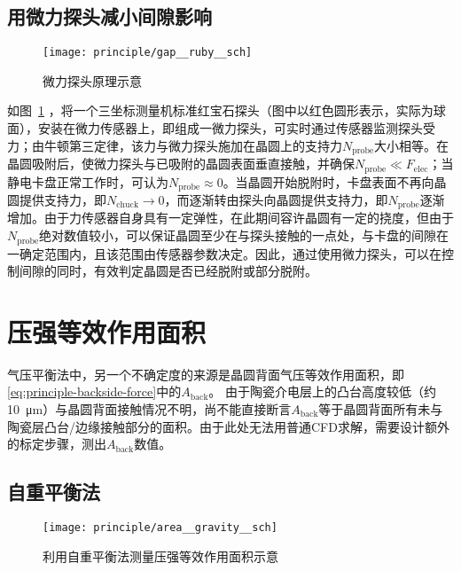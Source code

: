 \subsection{用微力探头减小间隙影响}\label{principle-gap-ruby}

\begin{figure}[tbhp]
\centering
\texttt{[image: principle/gap\_\_ruby\_\_sch]}
\caption{微力探头原理示意}
\label{fig:principle-gap-ruby-sch}
\end{figure}

如图~\ref{fig:principle-gap-ruby-sch} ，将一个三坐标测量机标准红宝石探头（图中以红色圆形表示，实际为球面），安装在微力传感器上，即组成一微力探头，可实时通过传感器监测探头受力；由牛顿第三定律，该力与微力探头施加在晶圆上的支持力$N_{\mathrm{probe}}$大小相等。在晶圆吸附后，使微力探头与已吸附的晶圆表面垂直接触，并确保$N_{\mathrm{probe}} \ll F_{\mathrm{elec}}$；当静电卡盘正常工作时，可认为$N_{\mathrm{probe}} \approx 0$。当晶圆开始脱附时，卡盘表面不再向晶圆提供支持力，即$N_{\mathrm{chuck}} \to 0$，而逐渐转由探头向晶圆提供支持力，即$N_{\mathrm{probe}}$逐渐增加。由于力传感器自身具有一定弹性，在此期间容许晶圆有一定的挠度，但由于$N_{\mathrm{probe}}$绝对数值较小，可以保证晶圆至少在与探头接触的一点处，与卡盘的间隙在一确定范围内，且该范围由传感器参数决定。因此，通过使用微力探头，可以在控制间隙的同时，有效判定晶圆是否已经脱附或部分脱附。




\section{压强等效作用面积}\label{principle-area}

气压平衡法中，另一个不确定度的来源是晶圆背面气压等效作用面积，即\eqref{eq:principle-backside-force}中的$A_{\mathrm{back}}$。
由于陶瓷介电层上的凸台高度较低（约\SI{10}{\micro\meter}）与晶圆背面接触情况不明，尚不能直接断言$A_{\mathrm{back}}$等于晶圆背面所有未与陶瓷层凸台/边缘接触部分的面积。由于此处无法用普通CFD求解，需要设计额外的标定步骤，测出$A_{\mathrm{back}}$数值。


\subsection{自重平衡法}\label{sec:principle-area-gravity}

\begin{figure}[tbhp]
\centering
\texttt{[image: principle/area\_\_gravity\_\_sch]}
\caption[自重法测等效面积示意]{利用自重平衡法测量压强等效作用面积示意}
\label{fig:principle-area-gravity-sch}
\end{figure}

